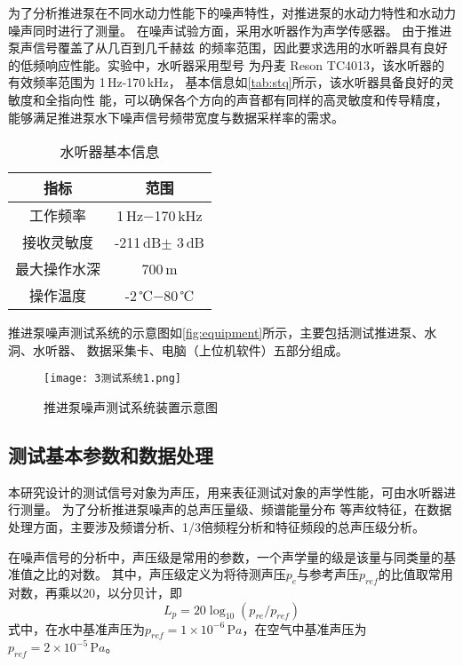 为了分析推进泵在不同水动力性能下的噪声特性，对推进泵的水动力特性和水动力噪声同时进行了测量。
在噪声试验方面，采用水听器作为声学传感器。
由于推进泵声信号覆盖了从几百到几千赫兹
的频率范围，因此要求选用的水听器具有良好的低频响应性能。实验中，水听器采用型号
为丹麦 Reson TC4013，该水听器的有效频率范围为 1\,Hz-170\,kHz，
基本信息如\autoref{tab:stq}所示，该水听器具备良好的灵敏度和全指向性
能，可以确保各个方向的声音都有同样的高灵敏度和传导精度，能够满足推进泵水下噪声信号频带宽度与数据采样率的需求。
\begin{table}[htbp]
    \centering
    \caption{\label{tab:stq}水听器基本信息}
    \begin{tabular}{cc}
     \toprule
     指标&范围\\
     \midrule
     工作频率&1\,Hz$- $170\,kHz\\
     接收灵敏度&-211\,dB$\pm$ 3\,dB\\
     最大操作水深&700\,m\\
     操作温度&-2\,℃$- $80\,℃\\
     \bottomrule
    \end{tabular}
\end{table}

推进泵噪声测试系统的示意图如\autoref{fig:equipment}所示，主要包括测试推进泵、水洞、水听器、
数据采集卡、电脑（上位机软件）五部分组成。
\begin{figure}[htbp]
    \centering
    \texttt{[image: 3测试系统1.png]}
    \caption{\label{fig:equipment}推进泵噪声测试系统装置示意图}
\end{figure}

\subsection{测试基本参数和数据处理}
本研究设计的测试信号对象为声压，用来表征测试对象的声学性能，可由水听器进行测量。
为了分析推进泵噪声的总声压量级、频谱能量分布
等声纹特征，在数据处理方面，主要涉及频谱分析、1/3倍频程分析和特征频段的总声压级分析。

在噪声信号的分析中，声压级是常用的参数，一个声学量的级是该量与同类量的基准值之比的对数。
其中，声压级定义为将待测声压$p_e$与参考声压$p_{ref}$的比值取常用对数，再乘以20，以分贝计，即
\begin{equation}
    \label{equ:p}
    L_{p} = 20\log_{10}{\left(p_{re}/p_{ref}\right )}
\end{equation}
式中，在水中基准声压为$p_{ref}= 1\times 10^{-6} \,\mathrm{P} a$，在空气中基准声压为$p_{ref}= 2\times 10^{-5} \,\mathrm{P} a$。
\begin{comment}
同理，振动加速度级也定义为加速度有效值$a_e$与基准加速度$a_{ref}$之比的以10为底的对数，再乘以20，以分贝计，即
\begin{equation}
    \label{equ:a}
    L_{a} = 20\log_{10}{\left(a_{re}/a_{ref}\right )}
\end{equation}
式中，基准加速度值为$a_{ref}= 1\times 10^{-6} \mathrm{\,m/s^2} $。
\end{comment}

